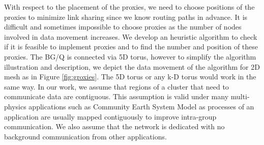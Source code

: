 \documentclass[final,5p,times]{elsarticle}
\begin{document}
With respect to the placement of the proxies, we need to choose positions of the proxies to minimize link sharing since we know routing paths in advance. It is difficult and sometimes impossible to choose proxies as the number of nodes involved in data movement increases. We develop an heuristic algorithm to check if it is feasible to implement proxies and to find the number and position of these proxies. The BG/Q is connected via 5D torus, however to simplify the algorithm illustration and description, we depict the data movement of the algorithm for 2D mesh as in Figure \ref{fig:groxies}. The 5D torus or any k-D torus would work in the same way. In our work, we assume that regions of a cluster that need to communicate data are contiguous. This assumption is valid under many multi-physics applications such as Community Earth System Model \cite{CESM:Collins} as processes of an application are usually mapped contiguously to improve intra-group communication. We also assume that the network is dedicated with no background communication from other applications.
\end{document}
